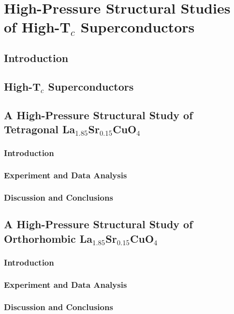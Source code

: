 \chapter{High-Pressure Structural Studies of High-T$_c$ Superconductors}

\section{Introduction}

\section{High-T$_c$ Superconductors}

\section{A High-Pressure Structural Study of Tetragonal La$_{1.85}$Sr$_{0.15}$CuO$_4$}

\subsection{Introduction}

\subsection{Experiment and Data Analysis}

\subsection{Discussion and Conclusions}

\section{A High-Pressure Structural Study of Orthorhombic La$_{1.85}$Sr$_{0.15}$CuO$_4$}

\subsection{Introduction}

\subsection{Experiment and Data Analysis}

\subsection{Discussion and Conclusions}

